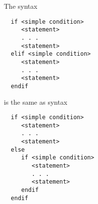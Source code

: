 The syntax
\begin{verbatim}
  if <simple condition>
     <statement>
     . . .
     <statement>
  elif <simple condition>
     <statement>
     . . .
     <statement>
  endif
\end{verbatim}
is the same as syntax
\begin{verbatim}
  if <simple condition>
     <statement>
     . . .
     <statement>
  else
     if <simple condition>
        <statement>
        . . .
        <statement>
     endif
  endif
\end{verbatim}
